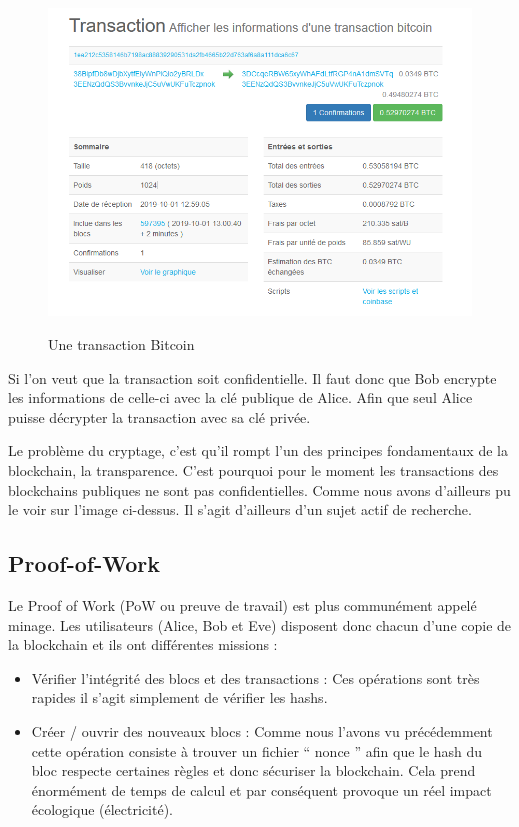 \documentclass[12pt, a4paper, oneside]{book}
\begin{document}
    \begin{figure}[H]
        \begin{center}
          \includegraphics[width=.9\textwidth]{images/transaction.png}
          \label{fig:transaction}
          \caption{Une transaction Bitcoin}
        \end{center}
    \end{figure}

    Si l’on veut que la transaction soit confidentielle. Il faut donc que Bob encrypte les informations de celle-ci avec la clé publique de Alice. Afin que seul Alice puisse décrypter la transaction avec sa clé privée. 
    
    Le problème du cryptage, c’est qu’il rompt l’un des principes fondamentaux de la blockchain, la transparence. C’est pourquoi pour le moment les transactions des blockchains publiques ne sont pas confidentielles. Comme nous avons d’ailleurs pu le voir sur l’image ci-dessus. Il s’agit d’ailleurs d’un sujet actif de recherche. 

    \subsection{Proof-of-Work}

    Le Proof of Work (PoW ou preuve de travail) est plus communément appelé minage. Les utilisateurs (Alice, Bob et Eve) disposent donc chacun d’une copie de la blockchain et ils ont différentes missions :

    \begin{itemize}
        \item Vérifier l’intégrité des blocs et des transactions : Ces opérations sont très rapides il s’agit simplement de vérifier les hashs.
        \item Créer / ouvrir des nouveaux blocs : Comme nous l’avons vu précédemment cette opération consiste à trouver un fichier \hyphenquote{french}{ nonce } afin que le hash du bloc respecte certaines règles et donc sécuriser la blockchain. Cela prend énormément de temps de calcul et par conséquent provoque un réel impact écologique (électricité).
        \newline
    \end{itemize}
\end{document}
